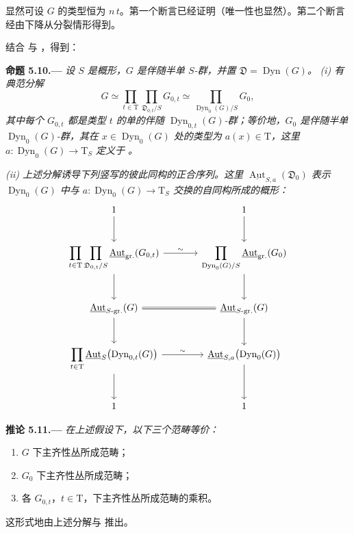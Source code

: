 显然可设 \(G\) 的类型恒为 \(n\,t\)。第一个断言已经证明（唯一性也显然）。第二个断言经由下降从分裂情形得到。

结合  与 ，得到：
\par\medskip\noindent{}\textbf{命题 5.10.---}\enspace
\emph{设 \(S\) 是概形，\(G\) 是伴随半单 \(S\)-群，并置 \(\mathfrak D=\operatorname{Dyn}(G)\)。}
\emph{(i) 有典范分解}
\[
  G\simeq
  \prod_{t\in\mathrm T}
  \prod_{\mathfrak D_{0,t}/S}G_{0,t}
  \simeq
  \prod_{\operatorname{Dyn}_0(G)/S}G_0,
\]
\emph{其中每个 \(G_{0,t}\) 都是类型 \(t\) 的单的伴随 \(\operatorname{Dyn}_{0,t}(G)\)-群；等价地，\(G_0\) 是伴随半单 \(\operatorname{Dyn}_0(G)\)-群，其在 \(x\in\operatorname{Dyn}_0(G)\) 处的类型为 \(a(x)\in\mathrm T\)，这里 \(a:\operatorname{Dyn}_0(G)\to\mathrm T_S\) 定义于 。}

\emph{(ii) 上述分解诱导下列竖写的彼此同构的正合序列。这里 \(\underline{\operatorname{Aut}}_{S,a}(\mathfrak D_0)\) 表示 \(\operatorname{Dyn}_0(G)\) 中与 \(a:\operatorname{Dyn}_0(G)\to\mathrm T_S\) 交换的自同构所成的概形：}
\[
\begin{tikzcd}[column sep=large,row sep=large]
1 \arrow[d] & 1 \arrow[d] \\
\displaystyle
\prod_{t\in\mathrm T}\prod_{\mathfrak D_{0,t}/S}
  \underline{\operatorname{Aut}}_{\mathrm{gr.}}(G_{0,t})
  \arrow[r,"\sim"] \arrow[d]
&
\displaystyle
\prod_{\operatorname{Dyn}_0(G)/S}
  \underline{\operatorname{Aut}}_{\mathrm{gr.}}(G_0)
  \arrow[d]
\\
\underline{\operatorname{Aut}}_{S\text{-}\mathrm{gr.}}(G)
  \arrow[r,equal] \arrow[d]
&
\underline{\operatorname{Aut}}_{S\text{-}\mathrm{gr.}}(G)
  \arrow[d]
\\
\displaystyle\prod_{t\in\mathrm T}
  \underline{\operatorname{Aut}}_S
    \bigl(\operatorname{Dyn}_{0,t}(G)\bigr)
  \arrow[r,"\sim"] \arrow[d]
&
\underline{\operatorname{Aut}}_{S,a}
  \bigl(\operatorname{Dyn}_0(G)\bigr)
  \arrow[d]
\\
1 & 1
\end{tikzcd}
\]

\par\medskip\noindent{}\textbf{推论 5.11.---}\enspace
\emph{在上述假设下，以下三个范畴等价：}
\begin{enumerate}
\item[(i)] \(G\) 下主齐性丛所成范畴；
\item[(ii)] \(G_0\) 下主齐性丛所成范畴；
\item[(iii)] 各 \(G_{0,t}\)，\(t\in\mathrm T\)，下主齐性丛所成范畴的乘积。
\end{enumerate}
这形式地由上述分解与  推出。

